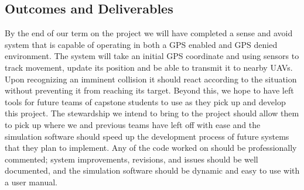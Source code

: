 \documentclass[12pt]{article}
\begin{document}
\subsection{Outcomes and Deliverables}
	By the end of our term on the project we will have completed a sense and avoid system that is capable of operating in both a GPS enabled and GPS denied environment. The system will take an initial GPS coordinate and using sensors to track movement, update its position and be able to transmit it to nearby UAVs. Upon recognizing an imminent collision it should react according to the situation without preventing it from reaching its target. Beyond this, we hope to have left tools for future teams of capstone students to use as they pick up and develop this project. The stewardship we intend to bring to the project should allow them to pick up where we and previous teams have left off with ease and the simulation software should speed up the development process of future systems that they plan to implement. Any of the code worked on should be professionally commented; system improvements, revisions, and issues should be well documented, and the simulation software should be dynamic and easy to use with a user manual.\\
\end{document}
